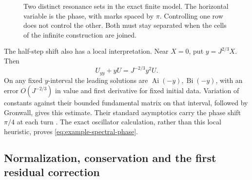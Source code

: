 \begin{figure}[htbp]
\centering
{}
\caption{Two distinct resonance sets in the exact finite model.
The horizontal variable is the phase, with marks spaced by $\pi$.
Controlling one row does not control the other. Both must stay
separated when the cells of the infinite construction are joined.}
\label{fig:two-denominators}
\end{figure}

The half-step shift also has a local interpretation. Near $X=0$,
put $y=J^{2/3}X$. Then
\[
 U_{yy}+yU=J^{-2/3}y^2U.
\]
On any fixed $y$-interval the leading solutions are
$\operatorname{Ai}(-y),\operatorname{Bi}(-y)$, with an error
$O(J^{-2/3})$ in value and first derivative for fixed initial data.
Variation of constants against their bounded fundamental matrix
on that interval, followed by Gronwall, gives this estimate.
Their standard asymptotics carry the phase shift $\pi/4$ at each
turn \cite[9.7.5--9.7.12]{DLMFAiry}. The exact oscillator calculation,
rather than this local heuristic, proves
\eqref{eq:example-spectral-phase}.

\subsection{Normalization, conservation and the first residual correction}

